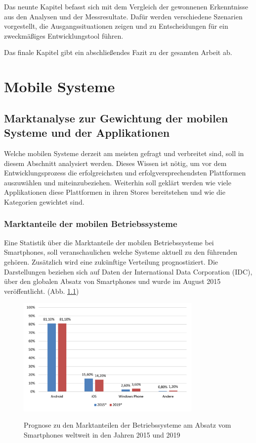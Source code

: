 \bigskip
Das neunte Kapitel befasst sich mit dem Vergleich der gewonnenen Erkenntnisse aus den Analysen und der Messresultate. Dafür werden verschiedene Szenarien vorgestellt, die Ausgangssituationen zeigen und zu Entscheidungen für ein zweckmäßiges Entwicklungstool führen.

\bigskip
Das finale Kapitel gibt ein abschließendes Fazit zu der gesamten Arbeit ab.

\chapter{Mobile Systeme}

\section{Marktanalyse zur Gewichtung der mobilen Systeme und der Applikationen}
Welche mobilen Systeme derzeit am meisten gefragt und verbreitet sind, soll in diesem Abschnitt analysiert werden. Dieses Wissen ist nötig, um vor dem Entwicklungsprozess die erfolgreichsten und erfolgversprechendsten Plattformen auszuwählen und miteinzubeziehen.
Weiterhin soll geklärt werden wie viele Applikationen diese Plattformen in ihren Stores bereitstehen und wie die Kategorien gewichtet sind.

\subsection{Marktanteile der mobilen Betriebssysteme}
\label{subsec:Marktanteile_mobile_Systeme}
Eine Statistik über die Marktanteile der mobilen Betriebssysteme bei Smartphones, soll veranschaulichen welche Systeme aktuell zu den führenden gehören. Zusätzlich wird eine zukünftige Verteilung prognostiziert. Die Darstellungen beziehen sich auf Daten der International Data Corporation (IDC), über den globalen Absatz von Smartphones und wurde im August 2015 veröffentlicht. (Abb. \ref{graph_mobile_systems})

\begin{figure}[htbp]
	\centering
	\includegraphics[width=0.8\textwidth]{Bilder/Marktanteile_Betriebssysteme}
	\caption{Prognose zu den Marktanteilen der Betriebssysteme am Absatz vom Smartphones weltweit in den Jahren 2015 und 2019}\label{graph_mobile_systems}\citep{marktanteile_betriebssysteme}
\end{figure}

